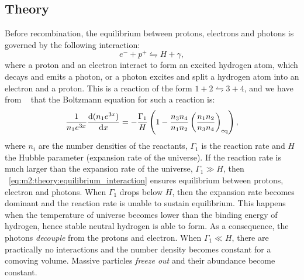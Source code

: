 \subsection{Theory}\label{sec:m2:theory}
    Before recombination, the equilibrium between protons, electrons and photons is governed by the following interaction:
    \begin{equation}\label{eq:m2:theory:equilibrium_interaction}
        e^-+p^+\leftrightharpoons H + \gamma,
    \end{equation}
    where a proton and an electron interact to form an excited hydrogen atom, which decays and emits a photon, or a photon excites and split a hydrogen atom into an electron and a proton. This is a reaction of the form $1+2\leftrightharpoons 3+4$, and we have from ~\cite{AST5220LectureNotes} that the Boltzmann equation for such a reaction is:
    \begin{equation}\label{eq:m2:theory:boltzmann_eq}
        \frac{1}{n_1e^{3x}}\dv{(n_1e^{3x})}{x} = -\frac{\Gamma_1}{H}\left(1-\frac{n_3n_4}{n_1n_2}\left(\frac{n_1n_2}{n_3n_4}\right)_\mathrm{eq}\right),
    \end{equation}
    where $n_i$ are the number densities of the reactants, $\Gamma_1$ is the reaction rate and $H$ the Hubble parameter (expansion rate of the universe). If the reaction rate is much larger than the expansion rate of the universe, $\Gamma_1 \gg H$, then ~\cref{eq:m2:theory:equilibrium_interaction} ensures equilibrium between protons, electron and photons. When $\Gamma_1$ drops below $H$, then the expansion rate becomes dominant and the reaction rate is unable to sustain equilibrium. This happens when the temperature of universe becomes lower than the binding energy of hydrogen, hence stable neutral hydrogen is able to form. As a consequence, the photons \textit{decouple} from the protons and electron. When $\Gamma_1 \ll H$, there are practically no interactions and the number density becomes constant for a comoving volume. Massive particles \textit{freeze out} and their abundance become constant. 

